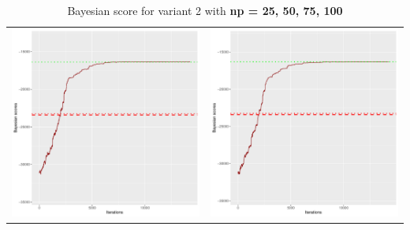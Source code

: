 \documentclass[]{scrartcl}
\begin{document}
\begin{table}[h!]
\begin{tabular}{cc}
\includegraphics[scale = 0.4]{./figs/win95pts/v2/75/bayBoundsEvolution-14252.pdf} & 
\includegraphics[scale = 0.4]{./figs/win95pts/v2/100/bayBoundsEvolution-14252.pdf} \\
\end{tabular}
\caption{Bayesian score for variant 2 with \textbf{np =  25, 50, 75, 100}}
\end{table}
\end{document}
